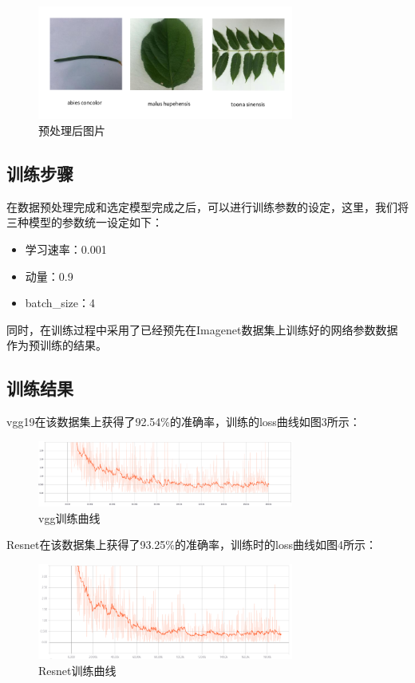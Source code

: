 \documentclass[a4paper]{ctexart} %
\begin{document}
\begin{figure}[htbp]
	\centering
	\includegraphics[width=0.75\textwidth]{img2.png}
	\caption{预处理后图片}
	\label{figure}
\end{figure}

\subsection*{训练步骤}
在数据预处理完成和选定模型完成之后，可以进行训练参数的设定，这里，我们将三种模型的参数统一设定如下：
\begin{itemize}
	\item 学习速率：0.001
	\item 动量：0.9
	\item batch\_size：4
\end{itemize}
同时，在训练过程中采用了已经预先在Imagenet数据集上训练好的网络参数数据作为预训练的结果。

\subsection*{训练结果}
vgg19在该数据集上获得了92.54\%的准确率，训练的loss曲线如图3所示：

\begin{figure}[htbp]
	\centering
	\includegraphics[width=0.75\textwidth]{vgg.png}
	\caption{vgg训练曲线}
	\label{figure}
\end{figure}

Resnet在该数据集上获得了93.25\%的准确率，训练时的loss曲线如图4所示：

\begin{figure}[htbp]
	\centering
	\includegraphics[width=0.75\textwidth]{resnet.png}
	\caption{Resnet训练曲线}
	\label{figure}
\end{figure}
\end{document}
